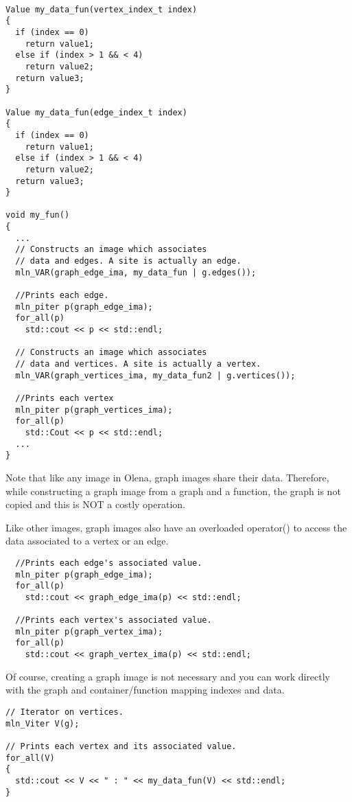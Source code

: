 \documentclass{report}
\begin{document}
\begin{lstlisting}[frame=single]

Value my_data_fun(vertex_index_t index)
{
  if (index == 0)
    return value1;
  else if (index > 1 && < 4)
    return value2;
  return value3;
}

Value my_data_fun(edge_index_t index)
{
  if (index == 0)
    return value1;
  else if (index > 1 && < 4)
    return value2;
  return value3;
}

void my_fun()
{
  ...
  // Constructs an image which associates
  // data and edges. A site is actually an edge.
  mln_VAR(graph_edge_ima, my_data_fun | g.edges());

  //Prints each edge.
  mln_piter p(graph_edge_ima);
  for_all(p)
    std::cout << p << std::endl;

  // Constructs an image which associates
  // data and vertices. A site is actually a vertex.
  mln_VAR(graph_vertices_ima, my_data_fun2 | g.vertices());

  //Prints each vertex
  mln_piter p(graph_vertices_ima);
  for_all(p)
    std::Cout << p << std::endl;
  ...
}
\end{lstlisting}

Note that like any image in Olena, graph images share their data. Therefore,
while constructing a graph image from a graph and a function, the graph is not
copied and this is NOT a costly operation.

Like other images, graph images also have an overloaded operator() to access the
data associated to a vertex or an edge.
\begin{lstlisting}
  //Prints each edge's associated value.
  mln_piter p(graph_edge_ima);
  for_all(p)
    std::cout << graph_edge_ima(p) << std::endl;

  //Prints each vertex's associated value.
  mln_piter p(graph_vertex_ima);
  for_all(p)
    std::cout << graph_vertex_ima(p) << std::endl;
\end{lstlisting}

Of course, creating a graph image is not necessary and you can work directly
with the graph and container/function mapping indexes and data.

\begin{lstlisting}
// Iterator on vertices.
mln_Viter V(g);

// Prints each vertex and its associated value.
for_all(V)
{
  std::cout << V << " : " << my_data_fun(V) << std::endl;
}
\end{lstlisting}
\end{document}
